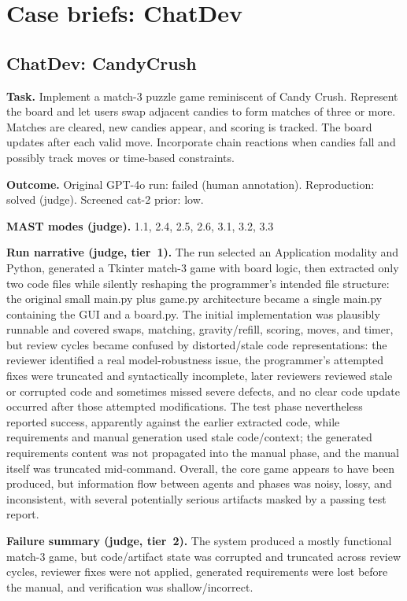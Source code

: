 \section{Case briefs: ChatDev}\label{app:chatdev}

\subsection*{ChatDev: CandyCrush}
\textbf{Task.} Implement a match-3 puzzle game reminiscent of Candy Crush. Represent the board and let users swap adjacent candies to form matches of three or more. Matches are cleared, new candies appear, and scoring is tracked. The board updates after each valid move. Incorporate chain reactions when candies fall and possibly track moves or time-based constraints.

\textbf{Outcome.} Original GPT-4o run: failed (human annotation). Reproduction: solved (judge). Screened cat-2 prior: low.

\textbf{MAST modes (judge).} 1.1, 2.4, 2.5, 2.6, 3.1, 3.2, 3.3

\textbf{Run narrative (judge, tier~1).} The run selected an Application modality and Python, generated a Tkinter match-3 game with board logic, then extracted only two code files while silently reshaping the programmer's intended file structure: the original small main.py plus game.py architecture became a single main.py containing the GUI and a board.py. The initial implementation was plausibly runnable and covered swaps, matching, gravity/refill, scoring, moves, and timer, but review cycles became confused by distorted/stale code representations: the reviewer identified a real model-robustness issue, the programmer's attempted fixes were truncated and syntactically incomplete, later reviewers reviewed stale or corrupted code and sometimes missed severe defects, and no clear code update occurred after those attempted modifications. The test phase nevertheless reported success, apparently against the earlier extracted code, while requirements and manual generation used stale code/context; the generated requirements content was not propagated into the manual phase, and the manual itself was truncated mid-command. Overall, the core game appears to have been produced, but information flow between agents and phases was noisy, lossy, and inconsistent, with several potentially serious artifacts masked by a passing test report.

\textbf{Failure summary (judge, tier~2).} The system produced a mostly functional match-3 game, but code/artifact state was corrupted and truncated across review cycles, reviewer fixes were not applied, generated requirements were lost before the manual, and verification was shallow/incorrect.

